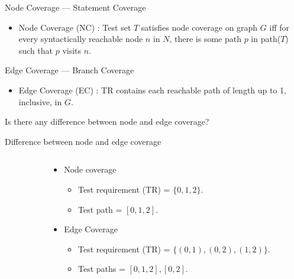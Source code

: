 \documentclass{beamer}
\begin{document}
\begin{frame}{Node Coverage --- Statement Coverage} 
  \begin{itemize}
  \item Node Coverage (NC) : Test set $T$ satisfies node coverage on
    graph $G$ iff for every syntactically reachable node $n$ in $N$, there
    is some path $p$ in path($T$) such that $p$ visits $n$.
  \end{itemize}
\end{frame}
\begin{frame}{Edge Coverage --- Branch Coverage}
  \begin{itemize}
  \item Edge Coverage (EC) : TR contains each reachable path of length
    up to 1, inclusive, in $G$.
  \end{itemize}
Is there any difference between node and edge coverage?
\end{frame}
\begin{frame}{Difference between node and edge coverage}
 \begin{columns}
   \begin{column}{0.5\textwidth}
   \end{column}
   \begin{column}{0.5\textwidth}
     \begin{itemize}
     \item Node coverage
       \begin{itemize}
       \item Test requirement (TR) = $\{0,1,2\}$.
       \item Test path = $[0,1,2]$.
       \end{itemize}
     \item Edge Coverage
       \begin{itemize}
       \item Test requirement (TR) = $\{(0,1),(0,2),(1,2)\}$.
       \item Test paths = $[0,1,2],[0,2]$.
       \end{itemize}
     \end{itemize}
   \end{column}
 \end{columns}
\end{frame}
\end{document}

